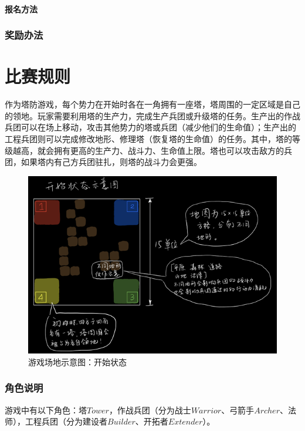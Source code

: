 \documentclass[a4paper,4pt]{article}
\begin{document}
\subsection{报名方法}


\section{奖励办法}

\part{比赛规则}

作为塔防游戏，每个势力在开始时各在一角拥有一座塔，塔周围的一定区域是自己的领地。玩家需要利用塔的生产力，完成生产兵团或升级塔的任务。生产出的作战兵团可以在场上移动，攻击其他势力的塔或兵团（减少他们的生命值）；生产出的工程兵团则可以完成修改地形、修理塔（恢复塔的生命值）的任务。其中，塔的等级越高，就会拥有更高的生产力、战斗力、生命值上限。塔也可以攻击敌方的兵团，如果塔内有己方兵团驻扎，则塔的战斗力会更强。

\begin{figure}[htbp]   %
  \centering
  \includegraphics[width=5.5 in]{01开始.jpg}
  \caption{游戏场地示意图：开始状态}
  \label{jpg:示例图片1}
\end{figure}



\section{角色说明}
游戏中有以下角色：塔$Tower$，作战兵团（分为战士$Warrior$、弓箭手$Archer$、法师），工程兵团（分为建设者$Builder$、开拓者$Extender$）。
\end{document}

